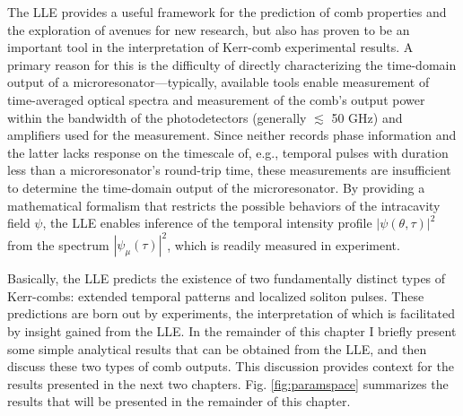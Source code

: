 The LLE provides a useful framework for the prediction of comb properties and the exploration of avenues for new research, but also has proven to be an important tool in the interpretation of Kerr-comb experimental results. A primary reason for this is the difficulty of directly characterizing the time-domain output of a microresonator---typically, available tools enable measurement of time-averaged optical spectra and measurement of the comb's output power within the bandwidth of the photodetectors (generally $\lesssim$ 50 GHz) and amplifiers used for the measurement. Since neither records phase information and the latter lacks response on the timescale of, e.g., temporal pulses with duration less than a microresonator's round-trip time, these measurements are insufficient to determine the time-domain output of the microresonator. By providing a mathematical formalism that restricts the possible behaviors of the intracavity field $\psi$, the LLE enables inference of the temporal intensity profile $|\psi(\theta,\tau)|^2$ from the spectrum $|\psi_\mu(\tau)|^2$, which is readily measured in experiment.  


Basically, the LLE predicts the existence of two fundamentally distinct types of Kerr-combs: extended temporal patterns and localized soliton pulses. These predictions are born out by experiments, the interpretation of which is facilitated by insight gained from the LLE. In the remainder of this chapter I briefly present some simple analytical results that can be obtained from the LLE, and then discuss these two types of comb outputs. This discussion provides context for the results presented in the next two chapters. Fig. \ref{fig:paramspace} summarizes the results that will be presented in the remainder of this chapter.
%

